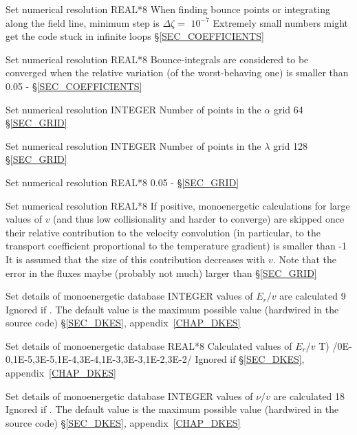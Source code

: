 {Set numerical resolution}
{REAL*8}
{When finding bounce points or integrating along the field line, minimum step is $\Delta\zeta=$}
{$10^{-7}$}
{Extremely small numbers might get the code stuck in infinite loops}
{\S\ref{SEC_COEFFICIENTS}}

{Set numerical resolution}
{REAL*8}
{Bounce-integrals are considered to be converged when the relative variation (of the worst-behaving one) is smaller than }
{0.05}
{-}
{\S\ref{SEC_COEFFICIENTS}}

{Set numerical resolution}
{INTEGER}
{Number of points in the $\alpha$ grid}
{64}
{}
{\S\ref{SEC_GRID}}

{Set numerical resolution}
{INTEGER}
{Number of points in the $\lambda$ grid}
{128}
{}
{\S\ref{SEC_GRID}}

{Set numerical resolution}
{REAL*8}
{}
{0.05}
{-}
{\S\ref{SEC_GRID}}

{Set numerical resolution}
{REAL*8}
If positive, monoenergetic calculations for large values of $v$ (and thus low collisionality and harder to converge) are skipped once their relative contribution to the velocity convolution (in particular, to the transport coefficient proportional to the temperature gradient) is smaller than 
{-1}
{It is assumed that the size of this contribution decreases with $v$. Note that the error in the fluxes maybe (probably not much) larger than }
{\S\ref{SEC_GRID}}

{Set details of monoenergetic database}
{INTEGER}
{ values of $E_r/v$ are calculated}
{9}%
{Ignored if \notf{}. The default value is the maximum possible value (hardwired in the source code)}
{\S\ref{SEC_DKES}, appendix~\ref{CHAP_DKES}}

{Set details of monoenergetic database}
{REAL*8}
{Calculated values of $E_r/v$ T)}
{/0E-0,1E-5,3E-5,1E-4,3E-4,1E-3,3E-3,1E-2,3E-2/}%
{Ignored if \notf{}}
{\S\ref{SEC_DKES}, appendix~\ref{CHAP_DKES}}

{Set details of monoenergetic database}
{INTEGER}
{ values of $\nu/v$ are calculated}
{18}
{Ignored if \notf{}. The default value is the maximum possible value (hardwired in the source code)}
{\S\ref{SEC_DKES}, appendix~\ref{CHAP_DKES}}

